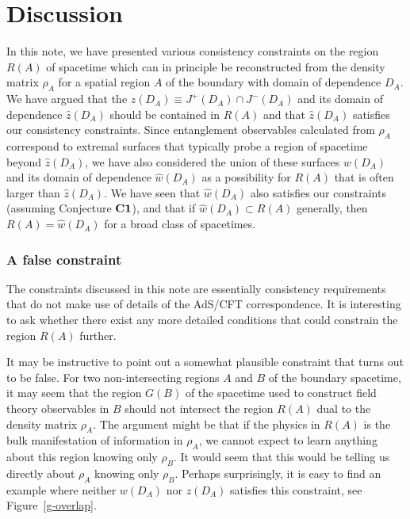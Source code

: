 \documentclass[12pt]{article}
\renewcommand{\(}{\left(}
\renewcommand{\)}{\right)}
\begin{document}
\section{Discussion}

In this note, we have presented various consistency constraints on the region $R(A)$ of spacetime which can in principle be reconstructed from the density matrix $\rho_A$ for a spatial region $A$ of the boundary with domain of dependence $D_A$. We have argued that the $z(D_A) \equiv J^+(D_A) \cap J^-(D_A)$ and its domain of dependence $\hat{z}(D_A)$ should be contained in $R(A)$ and that $\hat{z}(D_A)$ satisfies our consistency constraints. Since entanglement observables calculated from $\rho_A$ correspond to extremal surfaces that typically probe a region of spacetime beyond $\hat{z}(D_A)$, we have also considered the union of these surfaces $w(D_A)$ and its domain of dependence $\hat{w}(D_A)$ as a possibility for $R(A)$ that is often larger than $\hat{z}(D_A)$. We have seen that $\hat{w}(D_A)$ also satisfies our constraints (assuming Conjecture ${\bf C1}$), and that if $\hat{w}(D_A) \subset R(A)$ generally, then $R(A) = \hat{w}(D_A)$ for a broad class of spacetimes.

\subsubsection*{A false constraint}

The constraints discussed in this note are essentially consistency requirements that do not make use of details of the AdS/CFT correspondence. It is interesting to ask whether there exist any more detailed conditions that could constrain the region $R(A)$ further.

It may be instructive to point out a somewhat plausible constraint that turns out to be false. For two non-intersecting regions $A$ and $B$ of the boundary spacetime, it may seem that the region $G(B)$ of the spacetime used to construct field theory observables in $B$ should not intersect the region $R(A)$ dual to the density matrix $\rho_A$. The argument might be that if the physics in $R(A)$ is the bulk manifestation of information in $\rho_A$, we cannot expect to learn anything about this region knowing only $\rho_B$. It would seem that this would be telling us directly about $\rho_A$ knowing only $\rho_B$. Perhaps surprisingly, it is easy to find an example where neither $w(D_A)$ nor $z(D_A)$ satisfies this constraint, see Figure~\ref{g-overlap}.
\end{document}
